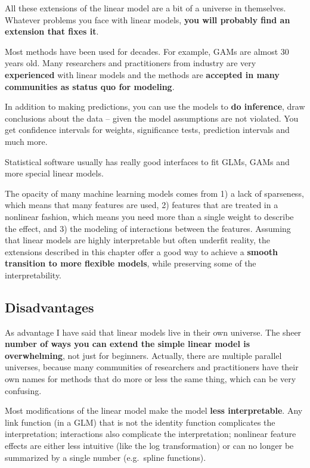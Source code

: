 \documentclass[
  12pt,
]{krantz}
\begin{document}
All these extensions of the linear model are a bit of a universe in themselves.
Whatever problems you face with linear models, \textbf{you will probably find an extension that fixes it}.

Most methods have been used for decades.
For example, GAMs are almost 30 years old.
Many researchers and practitioners from industry are very \textbf{experienced} with linear models and the methods are \textbf{accepted in many communities as status quo for modeling}.

In addition to making predictions, you can use the models to \textbf{do inference}, draw conclusions about the data -- given the model assumptions are not violated.
You get confidence intervals for weights, significance tests, prediction intervals and much more.

Statistical software usually has really good interfaces to fit GLMs, GAMs and more special linear models.

The opacity of many machine learning models comes from 1) a lack of sparseness, which means that many features are used, 2) features that are treated in a nonlinear fashion, which means you need more than a single weight to describe the effect, and 3) the modeling of interactions between the features.
Assuming that linear models are highly interpretable but often underfit reality, the extensions described in this chapter offer a good way to achieve a \textbf{smooth transition to more flexible models}, while preserving some of the interpretability.

\hypertarget{disadvantages-1}{%
\subsection{Disadvantages}\label{disadvantages-1}}

As advantage I have said that linear models live in their own universe.
The sheer \textbf{number of ways you can extend the simple linear model is overwhelming}, not just for beginners.
Actually, there are multiple parallel universes, because many communities of researchers and practitioners have their own names for methods that do more or less the same thing, which can be very confusing.

Most modifications of the linear model make the model \textbf{less interpretable}.
Any link function (in a GLM) that is not the identity function complicates the interpretation;
interactions also complicate the interpretation;
nonlinear feature effects are either less intuitive (like the log transformation) or can no longer be summarized by a single number (e.g.~spline functions).
\end{document}
